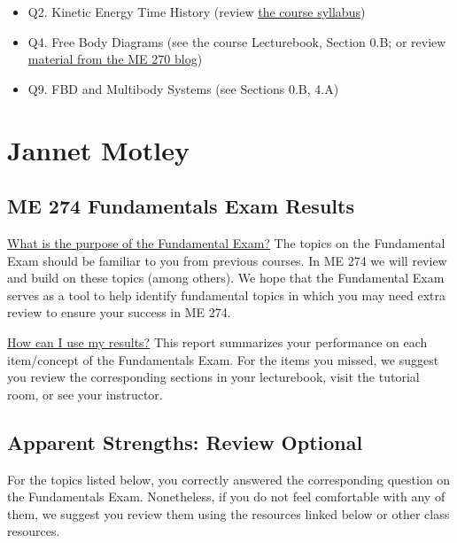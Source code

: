 \documentclass[11pt,letterpaper]{article}\usepackage[]{graphicx}\usepackage[]{color}
\begin{document}
\begin{itemize}\item Q2. Kinetic Energy Time History (review \href{https://www.purdue.edu/freeform/dynamics/wp-content/uploads/sites/4/2018/01/Syllabus-Spring-2018.pdf}{the course syllabus})
\item Q4. Free Body Diagrams (see the course Lecturebook, Section 0.B; or review \href{https://www.purdue.edu/statics/}{material from the ME 270 blog})
\item Q9. FBD and Multibody Systems (see Sections 0.B, 4.A)
\end{itemize}

\pagebreak
\section*{Jannet Motley}
\subsection*{ME 274 Fundamentals Exam Results}
\underline{What is the purpose of the Fundamental Exam?}  The topics on the Fundamental Exam should be familiar to you from previous courses.  In ME 274 we will review and build on these topics (among others). We hope that the Fundamental Exam serves as a tool to help identify fundamental topics in which you may need extra review to ensure your success in ME 274.\

\underline{How can I use my results?}  This report summarizes your performance on each item/concept of the Fundamentals Exam.  For the items you missed, we suggest you review the corresponding sections in your lecturebook, visit the tutorial room, or see your instructor.

\subsection*{Apparent Strengths: Review Optional}
For the topics listed below, you correctly answered the corresponding question on the Fundamentals Exam.  Nonetheless, if you do not feel comfortable with any of them, we suggest you review them using the resources linked below or other class resources.
\end{document}
